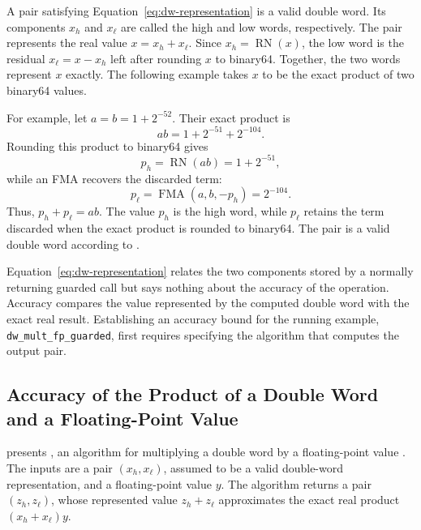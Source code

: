 A pair satisfying Equation~\eqref{eq:dw-representation} is a valid double
word.  Its components $x_h$ and $x_\ell$ are called the high and low words,
respectively.  The pair represents the real value $x=x_h+x_\ell$.  Since
$x_h=\operatorname{RN}(x)$, the low word is the residual
$x_\ell=x-x_h$ left after rounding $x$ to binary64.  Together, the two words
represent $x$ exactly.  The following example takes $x$ to be the exact
product of two binary64 values.

For example, let $a=b=1+2^{-52}$.  Their exact product is
\[
  ab=1+2^{-51}+2^{-104}.
\]
Rounding this product to binary64 gives
\[
  p_h=\operatorname{RN}(ab)=1+2^{-51},
\]
while an FMA recovers the discarded term:
\[
  p_\ell=\operatorname{FMA}(a,b,-p_h)=2^{-104}.
\]
Thus, $p_h+p_\ell=ab$.  The value $p_h$ is the high word, while $p_\ell$
retains the term discarded when the exact product is rounded to binary64.
The pair is a valid double word according to .

Equation~\eqref{eq:dw-representation} relates the two components stored by a
normally returning guarded call but says nothing about the accuracy of the
operation.  Accuracy compares the value represented by the computed double
word with the exact real result.  Establishing an accuracy bound for the
running example, \texttt{dw\_mult\_fp\_guarded}, first requires specifying the
algorithm that computes the output pair.

\subsection{Accuracy of the Product of a Double Word and a Floating-Point Value}
\label{sec:overview-running}

 presents \DWTimesFP{}, an algorithm for multiplying a
double word by a floating-point value \citep[Algorithm~9]{Joldes2017}.  The
inputs are a pair $(x_h,x_\ell)$, assumed to be a valid double-word
representation, and a floating-point value $y$.  The algorithm returns a pair
$(z_h,z_\ell)$, whose represented value $z_h+z_\ell$ approximates the exact
real product $(x_h+x_\ell)y$.


